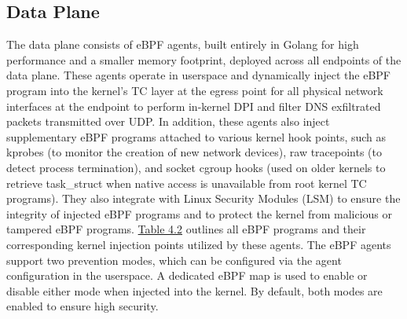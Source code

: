 \documentclass [11pt, proquest] {uwthesis}[2020/02/24]
\begin{document}
\subsection{Data Plane}
The data plane consists of eBPF agents, built entirely in Golang for high performance and a smaller memory footprint, deployed across all endpoints of the data plane. These agents operate in userspace and dynamically inject the eBPF program into the kernel’s TC layer at the egress point for all physical network interfaces at the endpoint to perform in-kernel DPI and filter DNS exfiltrated packets transmitted over UDP. In addition, these agents also inject supplementary eBPF programs attached to various kernel hook points, such as kprobes (to monitor the creation of new network devices), raw tracepoints (to detect process termination), and socket cgroup hooks (used on older kernels to retrieve task\_struct when native access is unavailable from root kernel TC programs). They also integrate with Linux Security Modules (LSM) to ensure the integrity of injected eBPF programs and to protect the kernel from malicious or tampered eBPF programs. \hyperref[sec:dp_kernel_prog_ty]{Table 4.2} outlines all eBPF programs and their corresponding kernel injection points utilized by these agents. 
The eBPF agents support two prevention modes, which can be configured via the agent configuration in the userspace. A dedicated eBPF map is used to enable or disable either mode when injected into the kernel. By default, both modes are enabled to ensure high security.
\end{document}
